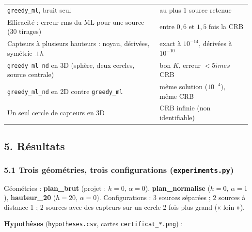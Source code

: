 \documentclass[
  french,
]{article}
\begin{document}
{\begin{longtable}[]{@{}
  >{\raggedright\arraybackslash}p{}
  >{\raggedright\arraybackslash}p{}@{}}
\texttt{greedy\_ml}, bruit seul & au plus 1 source retenue \\
Efficacité : erreur rms du ML pour une source (30 tirages) & entre
\(0{,}6\) et \(1{,}5\) fois la CRB \\
Capteurs à plusieurs hauteurs : noyau, dérivées, symétrie \(\pm h\) &
exact à \(10^{-14}\), dérivées à \(10^{-10}\) \\
\texttt{greedy\_ml\_nd} en 3D (sphère, deux cercles, source centrale) &
bon \(K\), erreur \(< 5   imes\) CRB \\
\texttt{greedy\_ml\_nd} en 2D contre \texttt{greedy\_ml} & même solution
(\(10^{-4}\)), même CRB \\
Un seul cercle de capteurs en 3D & CRB infinie (non identifiable) \\
\end{longtable}
}

\subsection{5. Résultats}\label{ruxe9sultats}

\subsubsection{\texorpdfstring{5.1 Trois géométries, trois
configurations
(\texttt{experiments.py})}{5.1 Trois géométries, trois configurations (experiments.py)}}\label{trois-guxe9omuxe9tries-trois-configurations-experiments.py}

Géométries : \textbf{plan\_brut} (projet : \(h = 0\), \(\alpha = 0\)),
\textbf{plan\_normalise} (\(h = 0\), \(\alpha = 1\)),
\textbf{hauteur\_20} (\(h = 20\), \(\alpha = 0\)). Configurations : 3
sources séparées ; 2 sources à distance 1 ; 2 sources avec des capteurs
sur un cercle 2 fois plus grand (« loin »).

\textbf{Hypothèses} (\texttt{hypotheses.csv}, cartes
\texttt{certificat\_*.png}) :
\end{document}
